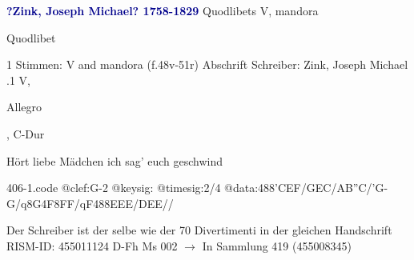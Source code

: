 \documentclass[twocolumn]{book}
\begin{document}
\newline \par \vspace{7pt} \textcolor{darkblue}{\textbf{?Zink, Joseph Michael?  1758-1829}}
\newline Quodlibets
\newline V, mandora
\newline \begin{itshape}[heading, f.48v:] Quodlibet\end{itshape} 
\newline \textcolor{darkblue}{}  1 Stimmen: V and mandora  (f.48v-51r)
\newline Abschrift
\newline Schreiber: Zink, Joseph Michael
.1  V, \begin{itshape}Allegro\end{itshape}, C-Dur
\newline \begin{footnotesize} Hört liebe Mädchen ich sag' euch geschwind \end{footnotesize}  
\begin{filecontents*}{406-1.code}
@clef:G-2
@keysig:
@timesig:2/4
@data:488'CEF/GEC/AB''C/'G-G/q8G4F8FF/qF488EEE/DEE//
\end{filecontents*}
\newline
%
\newline Der Schreiber ist der selbe wie der 70 Divertimenti in der gleichen Handschrift
\newline RISM-ID: 455011124
\newline D-Fh  Ms 002
\newline $\rightarrow$ In Sammlung 419 (455008345)
      
\end{document}
